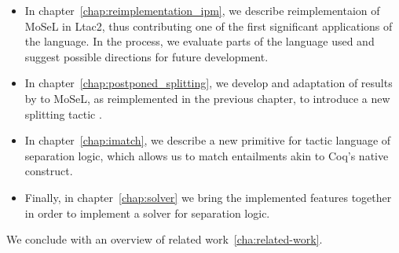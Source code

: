 \begin{itemize}
\item In chapter~\ref{chap:reimplementation_ipm}, we describe reimplementaion of MoSeL in Ltac2, thus contributing one of the first significant applications of the language.
  In the process, we evaluate parts of the language used and suggest possible directions for future development.
\item In chapter~\ref{chap:postponed_splitting}, we develop and adaptation of results by \citet{harlandResourceDistributionBooleanConstraints2003} to MoSeL, as reimplemented in the previous chapter, to introduce a new splitting tactic .
\item In chapter~\ref{chap:imatch}, we describe a new primitive  for tactic language of separation logic, which allows us to match entailments akin to Coq's native  construct.
\item Finally, in chapter~\ref{chap:solver} we bring the implemented features together in order to implement a solver for separation logic.
\end{itemize}
We conclude with an overview of related work~\ref{cha:related-work}.

